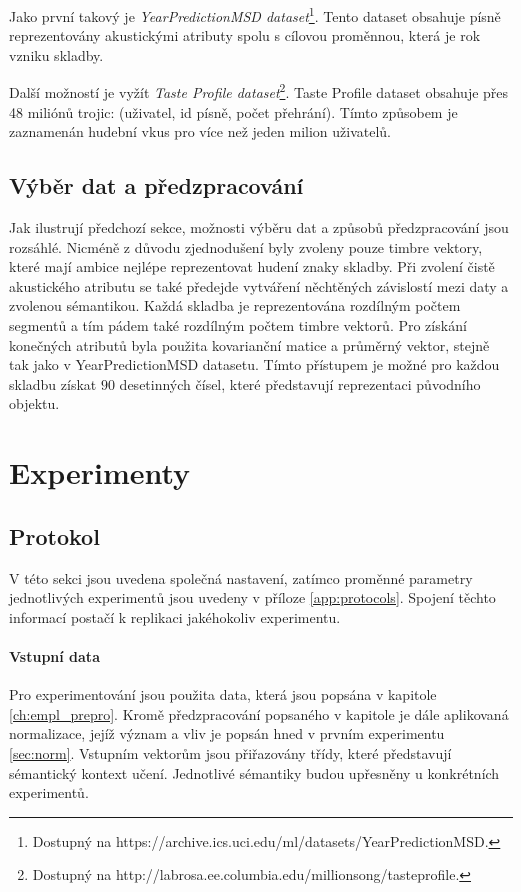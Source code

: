 \documentclass[thesis=M,czech]{FITthesis}[2012/06/26]
\begin{document}
Jako první takový je \textit{YearPredictionMSD dataset}\footnote{Dostupný na https://archive.ics.uci.edu/ml/datasets/YearPredictionMSD.}. Tento dataset obsahuje písně reprezentovány akustickými atributy spolu s cílovou proměnnou, která je rok vzniku skladby. 

Další možností je vyžít \textit{Taste Profile dataset}\footnote{Dostupný na http://labrosa.ee.columbia.edu/millionsong/tasteprofile.}. Taste Profile dataset obsahuje přes 48 miliónů trojic: (uživatel, id písně, počet přehrání). Tímto způsobem je zaznamenán hudební vkus pro více než jeden milion uživatelů.


\section{Výběr dat a předzpracování}
Jak ilustrují předchozí sekce, možnosti výběru dat a způsobů předzpracování jsou rozsáhlé. Nicméně z důvodu zjednodušení byly zvoleny pouze timbre vektory, které mají ambice nejlépe reprezentovat hudení znaky skladby. Při zvolení čistě akustického atributu se také předejde vytváření něchtěných závislostí mezi daty a zvolenou sémantikou. Každá skladba je reprezentována rozdílným počtem segmentů a tím pádem také rozdílným počtem timbre vektorů. Pro získání konečných atributů byla použita kovarianční matice a průměrný vektor, stejně tak jako v YearPredictionMSD datasetu. Tímto přístupem je možné pro každou skladbu získat $90$ desetinných čísel, které představují reprezentaci původního objektu. 




\chapter{Experimenty}\label{ch:experiments}
\section{Protokol}

V této sekci jsou uvedena společná nastavení, zatímco proměnné parametry jednotlivých experimentů jsou uvedeny v příloze \ref{app:protocols}. Spojení těchto informací postačí k replikaci jakéhokoliv experimentu.


\subsubsection*{Vstupní data}
Pro experimentování jsou použita data, která jsou popsána v kapitole \ref{ch:empl_prepro}. Kromě předzpracování popsaného v kapitole je dále aplikovaná normalizace, jejíž význam a vliv je popsán hned v prvním experimentu \ref{sec:norm}.
Vstupním vektorům jsou přiřazovány třídy, které představují sémantický kontext učení. Jednotlivé sémantiky budou upřesněny u konkrétních experimentů.
\end{document}
